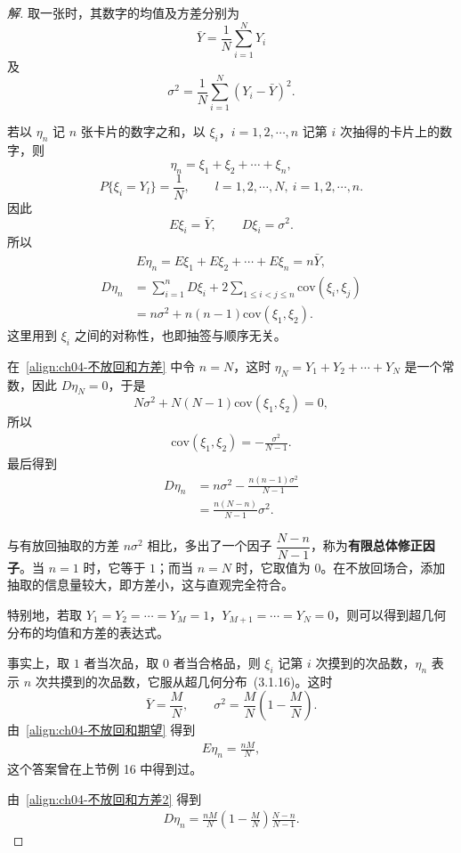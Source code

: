 \documentclass[../../main.tex]{subfiles}
\begin{document}
\begin{proof}[解]
取一张时，其数字的均值及方差分别为
\[
\bar{Y}=\frac{1}{N}\sum_{i=1}^N Y_i
\]
及
\[
\sigma^2=\frac{1}{N}\sum_{i=1}^N(Y_i-\bar{Y})^2.
\]

若以 $\eta_n$ 记 $n$ 张卡片的数字之和，以 $\xi_i$，$i=1,2,\cdots,n$ 记第 $i$ 次抽得的卡片上的数字，则
\[
\eta_n=\xi_1+\xi_2+\cdots+\xi_n,
\]
\[
P\{\xi_i=Y_l\}=\frac{1}{N},\qquad l=1,2,\cdots,N,\ i=1,2,\cdots,n.
\]
因此
\[
E\xi_i=\bar{Y},\qquad D\xi_i=\sigma^2.
\]
所以
\begin{align}
E\eta_n=E\xi_1+E\xi_2+\cdots+E\xi_n=n\bar{Y},\label{align:ch04-不放回和期望}
\end{align}
\begin{align}
D\eta_n&=\sum_{i=1}^n D\xi_i+2\sum_{1\leqslant i<j\leqslant n}\mathrm{cov}(\xi_i,\xi_j)\nonumber\\
&=n\sigma^2+n(n-1)\mathrm{cov}(\xi_1,\xi_2).\label{align:ch04-不放回和方差}
\end{align}
这里用到 $\xi_i$ 之间的对称性，也即抽签与顺序无关。

在~\eqref{align:ch04-不放回和方差} 中令 $n=N$，这时 $\eta_N=Y_1+Y_2+\cdots+Y_N$ 是一个常数，因此 $D\eta_N=0$，于是
\[
N\sigma^2+N(N-1)\mathrm{cov}(\xi_1,\xi_2)=0,
\]
所以
\begin{align}
\mathrm{cov}(\xi_1,\xi_2)=-\frac{\sigma^2}{N-1}.\label{align:ch04-不放回协方差}
\end{align}
最后得到
\begin{align}
D\eta_n&=n\sigma^2-\frac{n(n-1)\sigma^2}{N-1}\nonumber\\
&=\frac{n(N-n)}{N-1}\sigma^2.\label{align:ch04-不放回和方差2}
\end{align}

与有放回抽取的方差 $n\sigma^2$ 相比，多出了一个因子 $\dfrac{N-n}{N-1}$，称为\textbf{有限总体修正因子}。当 $n=1$ 时，它等于 $1$；而当 $n=N$ 时，它取值为 $0$。在不放回场合，添加抽取的信息量较大，即方差小，这与直观完全符合。

特别地，若取 $Y_1=Y_2=\cdots=Y_M=1$，$Y_{M+1}=\cdots=Y_N=0$，则可以得到超几何分布的均值和方差的表达式。

事实上，取 $1$ 者当次品，取 $0$ 者当合格品，则 $\xi_i$ 记第 $i$ 次摸到的次品数，$\eta_n$ 表示 $n$ 次共摸到的次品数，它服从超几何分布~(3.1.16)。这时
\[
\bar{Y}=\frac{M}{N},\qquad \sigma^2=\frac{M}{N}\left(1-\frac{M}{N}\right).
\]
由~\eqref{align:ch04-不放回和期望} 得到
\begin{align}
E\eta_n=\frac{nM}{N},\label{align:ch04-超几何期望2}
\end{align}
这个答案曾在上节例 16 中得到过。

由~\eqref{align:ch04-不放回和方差2} 得到
\begin{align}
D\eta_n=\frac{nM}{N}\left(1-\frac{M}{N}\right)\frac{N-n}{N-1}.\label{align:ch04-超几何方差}
\end{align}
\end{proof}
\end{document}
